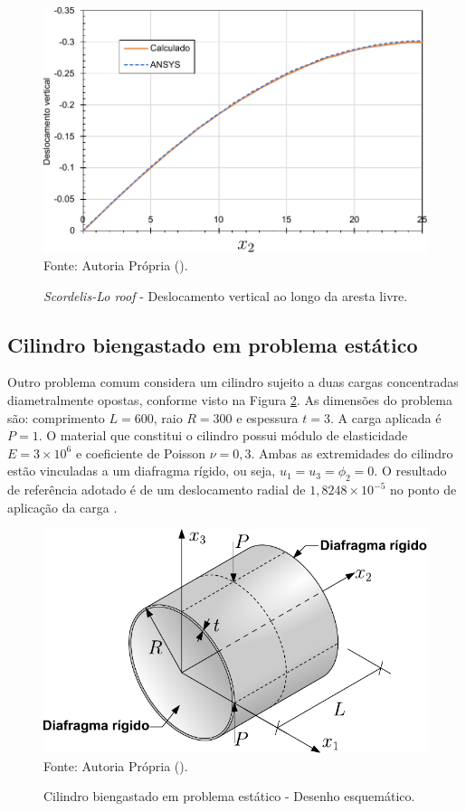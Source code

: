 \begin{figure}[h!]
    \centering
    \caption{\textit{Scordelis-Lo roof} - Deslocamento vertical ao longo da aresta livre.}
    \includegraphics[width=0.6\linewidth]{Figuras/scordelis/deslocamento.pdf}
    \\Fonte: Autoria Própria (\the\year).
    \label{fig:scordelis-graph}
\end{figure}

\subsection{Cilindro biengastado em problema estático} \label{Ap:Shell-cyl}

Outro problema comum considera um cilindro sujeito a duas cargas concentradas diametralmente opostas, conforme visto na Figura \ref{fig:cylinder-shell}. As dimensões do problema são: comprimento $L=600$, raio $R=300$ e espessura $t=3$. A carga aplicada é $P=1$. O material que constitui o cilindro possui módulo de elasticidade $E=3\times10^6$ e coeficiente de Poisson $\nu=0,3$. Ambas as extremidades do cilindro estão vinculadas a um diafragma rígido, ou seja, $u_1=u_3=\phi_2=0$. O resultado de referência adotado é de um deslocamento radial de $1,8248\times10^{-5}$ no ponto de aplicação da carga \cite{BELYTSCHKO1985221,CHAUDINH2023110222,ZHOU2022108568}.

\begin{figure}[h!]
    \centering
    \caption{Cilindro biengastado em problema estático - Desenho esquemático.}
    \includegraphics[width=0.65\linewidth]{Figuras/cylinder-shell/cylinder.pdf}
    \\Fonte: Autoria Própria (\the\year).
    \label{fig:cylinder-shell}
\end{figure}

